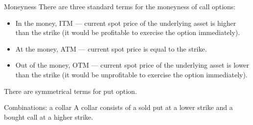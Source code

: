 \documentclass{beamer}
\begin{document}
\begin{frame}{Moneyness}
\justify
There are three standard terms for the \alert{moneyness} of call options:

\begin{itemize}
\justifying
\item In the money, ITM --- current spot price of the underlying asset is higher than the strike (it would be profitable to exercise the option immediately).
\item At the money, ATM --- current spot price is equal to the strike.
\item Out of the money, OTM --- current spot price of the underlying asset is lower than the strike (it would be unprofitable to exercise the option immediately).
\end{itemize}

\justify
There are symmetrical terms for put option.
\end{frame}



\begin{frame}{Combinations: a collar}
\justifying
A \alert{collar} consists of a sold put at a lower strike and a bought call at a higher strike.

\justifying
\centering
\end{frame}
\end{document}
